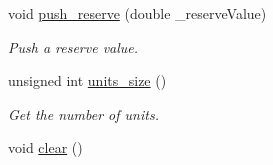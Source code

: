 \begin{DoxyCompactItemize}
void \hyperlink{classeo_u_c_p_data_a1bb315906b50f4836b934e94b52e6111}{push\-\_\-reserve} (double \-\_\-reserve\-Value)
\begin{DoxyCompactList}\small\item\em \-Push a reserve value. \end{DoxyCompactList}\item 
unsigned int \hyperlink{classeo_u_c_p_data_a48c9315ee1d06c8e3d0be1f920d15377}{units\-\_\-size} ()
\begin{DoxyCompactList}\small\item\em \-Get the number of units. \end{DoxyCompactList}\item 
\hypertarget{classeo_u_c_p_data_a3e3212855f98e3e01e28ba217f5bcbef}{void \hyperlink{classeo_u_c_p_data_a3e3212855f98e3e01e28ba217f5bcbef}{clear} ()}\label{classeo_u_c_p_data_a3e3212855f98e3e01e28ba217f5bcbef}


\end{DoxyCompactItemize}
